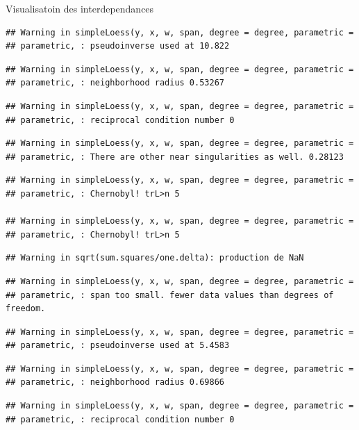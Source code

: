 \documentclass[11pt,ignorenonframetext,]{beamer}
\begin{document}
\begin{frame}[fragile]{Visualisatoin des interdependances}
\begin{verbatim}
## Warning in simpleLoess(y, x, w, span, degree = degree, parametric =
## parametric, : pseudoinverse used at 10.822
\end{verbatim}

\begin{verbatim}
## Warning in simpleLoess(y, x, w, span, degree = degree, parametric =
## parametric, : neighborhood radius 0.53267
\end{verbatim}

\begin{verbatim}
## Warning in simpleLoess(y, x, w, span, degree = degree, parametric =
## parametric, : reciprocal condition number 0
\end{verbatim}

\begin{verbatim}
## Warning in simpleLoess(y, x, w, span, degree = degree, parametric =
## parametric, : There are other near singularities as well. 0.28123
\end{verbatim}

\begin{verbatim}
## Warning in simpleLoess(y, x, w, span, degree = degree, parametric =
## parametric, : Chernobyl! trL>n 5

## Warning in simpleLoess(y, x, w, span, degree = degree, parametric =
## parametric, : Chernobyl! trL>n 5
\end{verbatim}

\begin{verbatim}
## Warning in sqrt(sum.squares/one.delta): production de NaN
\end{verbatim}

\begin{verbatim}
## Warning in simpleLoess(y, x, w, span, degree = degree, parametric =
## parametric, : span too small. fewer data values than degrees of freedom.
\end{verbatim}

\begin{verbatim}
## Warning in simpleLoess(y, x, w, span, degree = degree, parametric =
## parametric, : pseudoinverse used at 5.4583
\end{verbatim}

\begin{verbatim}
## Warning in simpleLoess(y, x, w, span, degree = degree, parametric =
## parametric, : neighborhood radius 0.69866
\end{verbatim}

\begin{verbatim}
## Warning in simpleLoess(y, x, w, span, degree = degree, parametric =
## parametric, : reciprocal condition number 0
\end{verbatim}


\end{frame}
\end{document}
